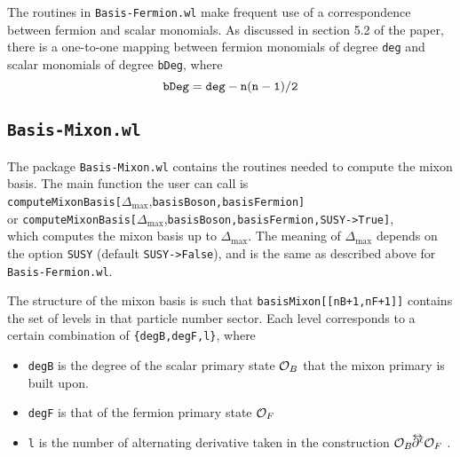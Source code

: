 \documentclass[12pt]{article}
\newcommand{\CO}{{\cal O}}
\newcommand\De\Delta
\newcommand{\Dmax}{\De_{\max}}
\newcommand\lrpar{\raise .8ex\hbox{$^\leftrightarrow$} \hspace{-9pt}
\partial}
\begin{document}
The routines in {\tt Basis-Fermion.wl} make frequent use of a correspondence between fermion and scalar monomials. As discussed in section 5.2 of the paper, there is a one-to-one mapping between fermion monomials of degree {\tt deg} and scalar monomials of degree {\tt  bDeg}, where 
\begin{equation*}
{\tt bDeg = deg - n(n-1)/2 }
\end{equation*}

\subsection{{\tt Basis-Mixon.wl}}
The package  {\tt Basis-Mixon.wl} contains the routines needed to compute the mixon basis. The main function the user can call is \\
{\tt computeMixonBasis[}$\Delta_{\textrm{max} } $,{\tt basisBoson,basisFermion]} \\
or {\tt computeMixonBasis[}$\Delta_{\textrm{max} } $,{\tt basisBoson,basisFermion,SUSY->True]},\\ 
which computes the mixon basis up to $\Dmax$. The meaning of $\Dmax$ depends on the option {\tt SUSY} (default {\tt SUSY->False}), and is the same as described above for  {\tt Basis-Fermion.wl}.

The structure of the mixon basis is such that
    {\tt basisMixon[[nB+1,nF+1]]}
contains the set of levels in that particle number sector.
Each level corresponds to a certain combination of {\tt \{degB,degF,l\}},
where
\begin{itemize}
\item {\tt degB} is the degree of the scalar primary state $\CO_B$ that the mixon primary is built upon.
\item {\tt degF} is that of the fermion primary state $\CO_F$
\item {\tt l} is the number of alternating derivative taken in the construction $\CO_B \lrpar^\ell \CO_F$ .
\end{itemize}
\end{document}
